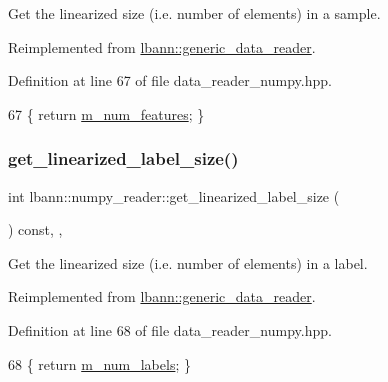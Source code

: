 Get the linearized size (i.\+e. number of elements) in a sample. 



Reimplemented from \hyperlink{classlbann_1_1generic__data__reader_a246a719477c8c7b6122d41b6f5618d41}{lbann\+::generic\+\_\+data\+\_\+reader}.



Definition at line 67 of file data\+\_\+reader\+\_\+numpy.\+hpp.


\begin{DoxyCode}
67 \{ \textcolor{keywordflow}{return} \hyperlink{classlbann_1_1numpy__reader_aef25f95077f565fa9616ec353b93f675}{m\_num\_features}; \}
\end{DoxyCode}
\mbox{\label{classlbann_1_1numpy__reader_aea3fe4402409e2bce9b5892c30779a20}} 
\subsubsection{\texorpdfstring{get\+\_\+linearized\+\_\+label\+\_\+size()}{get\_linearized\_label\_size()}}
{\footnotesize\ttfamily int lbann\+::numpy\+\_\+reader\+::get\+\_\+linearized\+\_\+label\+\_\+size (\begin{DoxyParamCaption}{ }\end{DoxyParamCaption}) const\hspace{0.3cm}{\ttfamily [inline]}, {\ttfamily [override]}, {\ttfamily [virtual]}}



Get the linearized size (i.\+e. number of elements) in a label. 



Reimplemented from \hyperlink{classlbann_1_1generic__data__reader_a99e8ba4f09fdc86d238ad7c8d2e2bce0}{lbann\+::generic\+\_\+data\+\_\+reader}.



Definition at line 68 of file data\+\_\+reader\+\_\+numpy.\+hpp.


\begin{DoxyCode}
68 \{ \textcolor{keywordflow}{return} \hyperlink{classlbann_1_1numpy__reader_ab311c3567e1ecc1770a4bc299ab0a3e2}{m\_num\_labels}; \}
\end{DoxyCode}
\mbox{\label{classlbann_1_1numpy__reader_a87510cf16928dc2d5451b10a72d47ce9}} 
